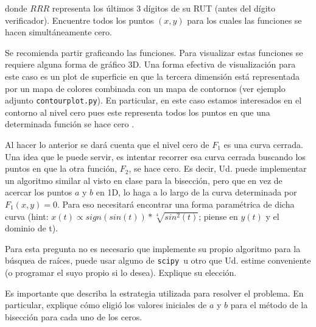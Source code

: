 \documentclass[letter, 11pt]{article}
\newcommand{\scipy}{\texttt{scipy}}
\begin{document}
\noindent donde $RRR$ representa los últimos 3 dígitos de su RUT (antes del
dígito verificador). Encuentre todos los puntos $(x, y)$ para los cuales las
funciones se hacen simultáneamente cero.

\begin{ayuda}
  \small

  Se recomienda partir graficando las funciones. Para visualizar estas
  funciones se requiere alguna forma de gráfico 3D. Una forma efectiva de
  visualización para este caso es un plot de superficie en que la tercera
  dimensión está representada por un mapa de colores combinada con un mapa de
  contornos (ver ejemplo adjunto \texttt{contourplot.py}). En particular, en
  este caso estamos interesados en el contorno al nivel cero pues este
  representa todos los puntos en que una determinada función se hace cero .

  Al hacer lo anterior se dará cuenta que el nivel cero de $F_1$ es una curva
  cerrada. Una idea que le puede servir, es intentar recorrer esa curva cerrada
  buscando los puntos en que la otra función, $F_2$, se hace cero. Es decir,
  Ud.  puede implementar un algoritmo similar al visto en clase para la
  bisección, pero que en vez de acercar los puntos $a$ y $b$ en 1D, lo haga a
  lo largo de la curva determinada por $F_1(x, y)=0$. Para eso necesitará
  encontrar una forma paramétrica de dicha curva (hint: $x(t) \propto
  sign(sin(t)) * \sqrt[4]{sin^2(t)}$; piense en $y(t)$ y el dominio de t).

\end{ayuda}

Para esta pregunta no es necesario que implemente su propio algoritmo para la
búsquea de raíces, puede usar alguno de \scipy~u otro que Ud. estime
conveniente (o programar el suyo propio si lo desea). Explique su elección.

Es importante que describa la estrategia utilizada para resolver el problema.
En particular, explique cómo eligió los valores iniciales de $a$ y $b$ para el
método de la bisección para cada uno de los ceros.
\end{document}
